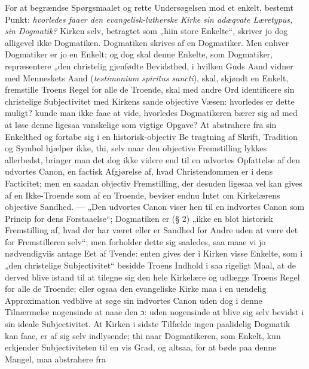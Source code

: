 For at begrændse Spørgsmaalet og rette Undersøgelsen mod et
enkelt, bestemt Punkt: \emph{hvorledes faaer den
evangelisk-lutherske Kirke sin adæqvate Læretypus, sin Dogmatik?}
Kirken selv, betragtet som „hiin store Enkelte“, skriver jo dog
alligevel ikke Dogmatiken. Dogmatiken skrives af en Dogmatiker.
Men enhver Dogmatiker er jo en Enkelt; og dog skal denne Enkelte,
som Dogmatiker, repræsentere „den christelig gjenfødte
Bevidsthed, i hvilken Guds Aand vidner med Menneskets Aand
(\textit{testimonium spiritus sancti}), skal, skjøndt en Enkelt,
fremstille Troens Regel for alle de Troende, skal med andre Ord
identificere sin christelige Subjectivitet med Kirkens sande
objective Væsen: hvorledes er dette muligt? kunde man ikke faae at
vide, hvorledes Dogmatikeren bærer sig ad med at løse denne
ligesaa vanskelige som vigtige Opgave? At abstrahere fra sin
Enkelthed og fortabe sig i en historisk-objectiv Be%
tragtning af Skrift, Tradition og Symbol hjælper ikke, thi, selv
naar den objective Fremstilling lykkes allerbedst, bringer man det
dog ikke videre end til en udvortes Opfattelse af den udvortes
Canon, en factisk Afgjørelse af, hvad Christendommen er i dens
Facticitet; men en saadan objectiv Fremstilling, der desuden
ligesaa vel kan gives af en Ikke-Troende som af en Troende,
beviser endnu Intet om Kirkelærens objective Sandhed. --- „Den
udvortes Canon viser hen til en indvortes Canon som Princip for
dens Forstaaelse“; Dogmatiken er (§ 2) „ikke en blot historisk
Fremstilling af, hvad der har været eller er Sandhed for Andre
uden at være det for Fremstilleren selv“; men forholder dette sig
saaledes, saa maae vi jo nødvendigviis antage Eet af Tvende:
enten gives der i Kirken visse Enkelte, som i „den christelige
Subjectivitet“ besidde Troens Indhold i saa rigeligt Maal, at de
derved blive istand til at tilegne sig den hele Kirkelære og
udlægge Troens Regel for alle de Troende; eller ogsaa den
evangeliske Kirke maa i en uendelig Approximation vedblive at søge
sin indvortes Canon uden dog i denne Tilnærmelse nogensinde at
naae den ɔ: uden nogensinde at blive sig selv bevidst i sin ideale
Subjectivitet. At Kirken i sidste Tilfælde ingen paalidelig
Dogmatik kan faae, er af sig selv indlysende; thi naar
Dogmatikeren, som Enkelt, kun erkjender Subjectiviteten til en vis
Grad, og altsaa, for at bøde paa denne Mangel, maa abstrahere fra
